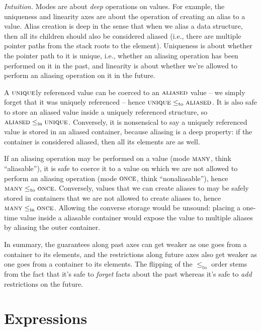 \documentclass{article}
\newcommand{\leqto}{\mathrel{\leq_{\mathrm{to}}}}
\newcommand{\leqin}{\mathrel{\leq_{\mathrm{in}}}}
\newcommand{\mode}[1]{\textsc{#1}}
\begin{document}
\noindent\emph{Intuition.}
Modes are about \emph{deep} operations on values. For example, the uniqueness and linearity axes are about the operation of creating an alias to a value. Alias creation is deep in the sense that when we alias a data structure, then all its children should also be considered aliased (i.e., there are multiple pointer paths from the stack roots to the element). Uniqueness is about whether the pointer path to it is unique, i.e., whether an aliasing operation has been performed on it in the past, and linearity is about whether we're allowed to perform an aliasing operation on it in the future.

A $\mode{unique}$ly referenced value can be coerced to an $\mode{aliased}$ value -- we simply forget that it was uniquely referenced -- hence $\mode{unique} \leqto \mode{aliased}$. It is also safe to store an aliased value inside a uniquely referenced structure, so $\mode{aliased} \leqin \mode{unique}$. Conversely, it is nonsensical to say a uniquely referenced value is stored in an aliased container, because aliasing is a deep property: if the container is considered aliased, then all its elements are as well.

If an aliasing operation may be performed on a value (mode $\mode{many}$, think ``aliasable''), it is safe to coerce it to a value on which we are not allowed to perform an aliasing operation (mode $\mode{once}$, think ``nonaliasable''), hence $\mode{many} \leqto \mode{once}$.
Conversely, values that we can create aliases to may be safely stored in containers that we are not allowed to create aliases to, hence $\mode{many} \leqin \mode{once}$.
Allowing the converse storage would be unsound: placing a one-time value inside a aliasable container would expose the value to multiple aliases by aliasing the outer container.

In summary, the guarantees along past axes can get weaker as one goes from a container to its elements, and the restrictions along future axes also get weaker as one goes from a container to its elements.
The flipping of the $\leqto$ order stems from the fact that it's safe to \emph{forget} facts about the past whereas it's safe to \emph{add} restrictions on the future.


\section{Expressions}
\end{document}

